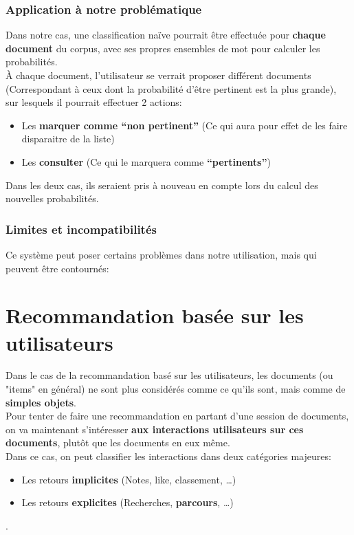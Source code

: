             \subsubsection{Application à notre problématique}
                Dans notre cas, une classification naïve pourrait être effectuée pour \textbf{chaque document} du corpus, avec ses propres ensembles de mot pour calculer les probabilités.\\
                À chaque document, l'utilisateur se verrait proposer différent documents (Correspondant à ceux dont la probabilité d'être pertinent est la plus grande), sur lesquels il pourrait effectuer 2 actions:
                \begin{itemize}
                    \item Les \textbf{marquer comme ``non pertinent''} (Ce qui aura pour effet de les faire disparaitre de la liste)
                    \item Les \textbf{consulter} (Ce qui le marquera comme \textbf{``pertinents''})
                \end{itemize}
                Dans les deux cas, ils seraient pris à nouveau en compte lors du calcul des nouvelles probabilités.
            \subsubsection{Limites et incompatibilités}
                Ce système peut poser certains problèmes dans notre utilisation, mais qui peuvent être contournés: %
        \subsection{}
    \section{Recommandation basée sur les utilisateurs}
        Dans le cas de la recommandation basé sur les utilisateurs, les documents (ou "items" en général) ne sont plus considérés comme ce qu'ils sont, mais comme de \textbf{simples objets}.\\
        Pour tenter de faire une recommandation en partant d'une session de documents, on va maintenant s'intéresser \textbf{aux interactions utilisateurs sur ces documents}, plutôt que les documents en eux même.\\

        Dans ce cas, on peut classifier les interactions dans deux catégories majeures:
        \begin{itemize}
            \item Les retours \textbf{implicites} (Notes, like, classement, \ldots)
            \item Les retours \textbf{explicites} (Recherches, \textbf{parcours}, \ldots)
        \end{itemize}.\\

